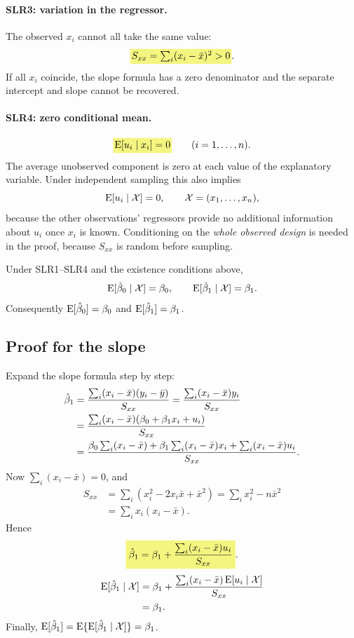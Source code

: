 \paragraph{SLR3: variation in the regressor.}
The observed $x_i$ cannot all take the same value:
\[\hy{$S_{xx}=\sum_i(x_i-\bar x)^2>0$}.\]
If all $x_i$ coincide, the slope formula has a zero denominator and the separate intercept and slope cannot be recovered.

\paragraph{SLR4: zero conditional mean.}
\[\hy{$\E[u_i\mid x_i]=0$}\qquad(i=1,\ldots,n).\]
The average unobserved component is zero at each value of the explanatory variable. Under independent sampling this also implies
\[\operatorname{E}[u_i\mid\mathcal X]=0,\qquad\mathcal X=(x_1,\ldots,x_n),\]
because the other observations' regressors provide no additional information about $u_i$ once $x_i$ is known. Conditioning on the \emph{whole observed design} is needed in the proof, because $S_{xx}$ is random before sampling.

\begin{theorem}\label{thm:simple-unbiased}
Under SLR1--SLR4 and the existence conditions above,
\[\operatorname{E}[\hat\beta_0\mid\mathcal X]=\beta_0,\qquad
\operatorname{E}[\hat\beta_1\mid\mathcal X]=\beta_1.\]
Consequently $\operatorname{E}[\hat\beta_0]=\beta_0$ and $\operatorname{E}[\hat\beta_1]=\beta_1$.
\end{theorem}

\subsection{Proof for the slope}
Expand the slope formula step by step:
\begin{align}
\hat\beta_1
&=\frac{\sum_i(x_i-\bar x)(y_i-\bar y)}{S_{xx}}
=\frac{\sum_i(x_i-\bar x)y_i}{S_{xx}}\notag\\
&=\frac{\sum_i(x_i-\bar x)(\beta_0+\beta_1x_i+u_i)}{S_{xx}}\notag\\
&=\frac{\beta_0\sum_i(x_i-\bar x)
+\beta_1\sum_i(x_i-\bar x)x_i+\sum_i(x_i-\bar x)u_i}{S_{xx}}.\label{eq:slope-expansion}
\end{align}
Now $\sum_i(x_i-\bar x)=0$, and
\begin{align*}
S_{xx}&=\sum_i(x_i^2-2x_i\bar x+\bar x^2)
=\sum_i x_i^2-n\bar x^2\\
&=\sum_i x_i(x_i-\bar x).
\end{align*}
Hence
\begin{equation}\label{eq:slope-error}
\hm{\hat\beta_1=\beta_1+\frac{\sum_i(x_i-\bar x)u_i}{S_{xx}}}.
\end{equation}
\begin{align*}
\operatorname{E}[\hat\beta_1\mid\mathcal X]
&=\beta_1+\frac{\sum_i(x_i-\bar x)\operatorname{E}[u_i\mid\mathcal X]}{S_{xx}}\\
&=\beta_1.
\end{align*}
Finally, $\operatorname{E}[\hat\beta_1]=\operatorname{E}\{\operatorname{E}[\hat\beta_1\mid\mathcal X]\}=\beta_1$. 

